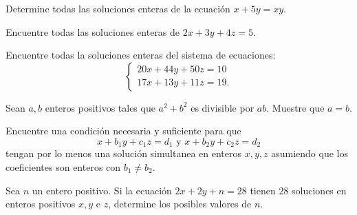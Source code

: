 \documentclass[12pt]{scrartcl}
\begin{document}
\begin{problem} 
Determine todas las soluciones enteras  de la ecuación $x+5y=xy$.
  \begin{hint}
  
  \end{hint}
\end{problem}

\begin{problem}
Encuentre todas las soluciones enteras de $2x+3y+4z=5$.
  \begin{hint}
  
  \end{hint}
\end{problem}

\begin{problem}
Encuentre todas la soluciones enteras del sistema de ecuaciones:$$\left\lbrace \begin{array}{c}
20x+44y+50z=10\\ 17x+13y+11z=19.
\end{array}\right.$$
  \begin{hint}
  
  \end{hint}
\end{problem}

\begin{problem}
Sean $a,b$ enteros positivos tales que $a^2+b^2$ es divisible por $ab$. Muestre que $a=b$.
  \begin{hint}
  
  \end{hint}
\end{problem}

\begin{problem}
Encuentre una condición necesaria y suficiente para que $$x+b_1y+c_1z=d_1\mbox{ y }x+b_2y+c_2z=d_2$$tengan por lo menos una solución simultanea en enteros $x,y,z$ asumiendo que los coeficientes son enteros con $b_1\not = b_2$.
  \begin{hint}
  
  \end{hint}
\end{problem}

\begin{problem}[ACM 1989]
Sea $n$ un entero positivo. Si la ecuación $2x+2y+n=28$ tienen $28$ soluciones en enteros positivos $x,y$ e $z$, determine los posibles valores de $n$.
  \begin{hint}
  
  \end{hint}
\end{problem}
\end{document}
